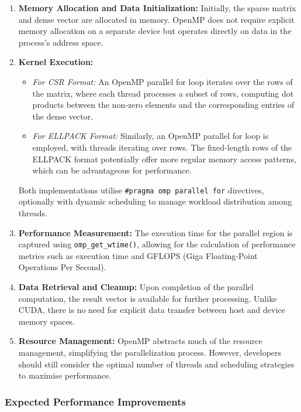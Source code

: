 \documentclass[12pt,oneside]{book} %
\begin{document}
\begin{enumerate}
    \item \textbf{Memory Allocation and Data Initialization:} Initially, the sparse matrix and dense vector are allocated in memory. OpenMP does not require explicit memory allocation on a separate device but operates directly on data in the process's address space.

    \item \textbf{Kernel Execution:}
          \begin{itemize}
              \item \textit{For CSR Format:} An OpenMP parallel for loop iterates over the rows of the matrix, where each thread processes a subset of rows, computing dot products between the non-zero elements and the corresponding entries of the dense vector.
              \item \textit{For ELLPACK Format:} Similarly, an OpenMP parallel for loop is employed, with threads iterating over rows. The fixed-length rows of the ELLPACK format potentially offer more regular memory access patterns, which can be advantageous for performance.
          \end{itemize}
          Both implementations utilise \texttt{\#pragma omp parallel for} directives, optionally with dynamic scheduling to manage workload distribution among threads.

    \item \textbf{Performance Measurement:} The execution time for the parallel region is captured using \texttt{omp\_get\_wtime()}, allowing for the calculation of performance metrics such as execution time and GFLOPS (Giga Floating-Point Operations Per Second).

    \item \textbf{Data Retrieval and Cleanup:} Upon completion of the parallel computation, the result vector is available for further processing. Unlike CUDA, there is no need for explicit data transfer between host and device memory spaces.

    \item \textbf{Resource Management:} OpenMP abstracts much of the resource management, simplifying the parallelization process. However, developers should still consider the optimal number of threads and scheduling strategies to maximise performance.
\end{enumerate}

\subsubsection{Expected Performance Improvements}
\end{document}
